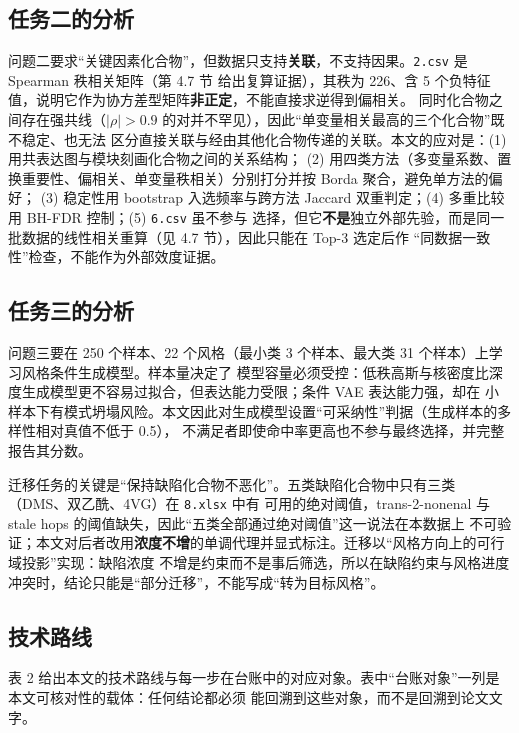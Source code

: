 \documentclass[
  a4paper,12pt]{article}
\newcounter{none} %
\begin{document}
\subsection{任务二的分析}\label{ux4efbux52a1ux4e8cux7684ux5206ux6790}

问题二要求``关键因素化合物''，但数据只支持\textbf{关联}，不支持因果。\texttt{2.csv}
是 Spearman 秩相关矩阵（第 4.7 节 给出复算证据），其秩为 226、含 5
个负特征值，说明它作为协方差型矩阵\textbf{非正定}，不能直接求逆得到偏相关。
同时化合物之间存在强共线（\(|\rho|>0.9\)
的对并不罕见），因此``单变量相关最高的三个化合物''既不稳定、也无法
区分直接关联与经由其他化合物传递的关联。本文的应对是：(1)
用共表达图与模块刻画化合物之间的关系结构； (2)
用四类方法（多变量系数、置换重要性、偏相关、单变量秩相关）分别打分并按
Borda 聚合，避免单方法的偏好； (3) 稳定性用 bootstrap 入选频率与跨方法
Jaccard 双重判定；(4) 多重比较用 BH-FDR 控制；(5) \texttt{6.csv}
虽不参与
选择，但它\textbf{不是}独立外部先验，而是同一批数据的线性相关重算（见
4.7 节），因此只能在 Top-3 选定后作
``同数据一致性''检查，不能作为外部效度证据。

\subsection{任务三的分析}\label{ux4efbux52a1ux4e09ux7684ux5206ux6790}

问题三要在 250 个样本、22 个风格（最小类 3 个样本、最大类 31
个样本）上学习风格条件生成模型。样本量决定了
模型容量必须受控：低秩高斯与核密度比深度生成模型更不容易过拟合，但表达能力受限；条件
VAE 表达能力强，却在
小样本下有模式坍塌风险。本文因此对生成模型设置``可采纳性''判据（生成样本的多样性相对真值不低于
0.5）， 不满足者即使命中率更高也不参与最终选择，并完整报告其分数。

迁移任务的关键是``保持缺陷化合物不恶化''。五类缺陷化合物中只有三类（DMS、双乙酰、4VG）在
\texttt{8.xlsx} 中有 可用的绝对阈值，trans-2-nonenal 与 stale hops
的阈值缺失，因此``五类全部通过绝对阈值''这一说法在本数据上
不可验证；本文对后者改用\textbf{浓度不增}的单调代理并显式标注。迁移以``风格方向上的可行域投影''实现：缺陷浓度
不增是约束而不是事后筛选，所以在缺陷约束与风格进度冲突时，结论只能是``部分迁移''，不能写成``转为目标风格''。

\subsection{技术路线}\label{ux6280ux672fux8defux7ebf}

表 2
给出本文的技术路线与每一步在台账中的对应对象。表中``台账对象''一列是本文可核对性的载体：任何结论都必须
能回溯到这些对象，而不是回溯到论文文字。
\end{document}
